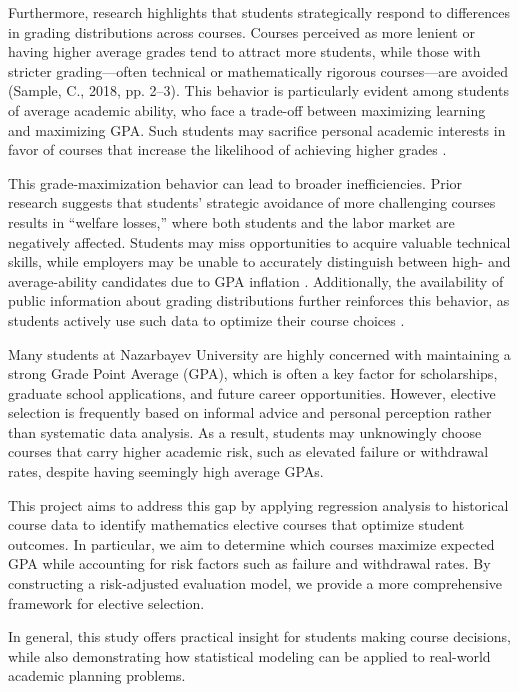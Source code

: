 \documentclass[a4paper,12pt,reqno]{amsart}
\numberwithin{equation}{section}
\theoremstyle{plain}
\theoremstyle{definition}
\begin{document}
Furthermore, research highlights that students strategically respond to differences in grading distributions across courses. Courses perceived as more lenient or having higher average grades tend to attract more students, while those with stricter grading—often technical or mathematically rigorous courses—are avoided (Sample, C., 2018, pp. 2–3). This behavior is particularly evident among students of average academic ability, who face a trade-off between maximizing learning and maximizing GPA. Such students may sacrifice personal academic interests in favor of courses that increase the likelihood of achieving higher grades \parencite[pp.8-9]{Sample2018}.

This grade-maximization behavior can lead to broader inefficiencies. Prior research suggests that students’ strategic avoidance of more challenging courses results in “welfare losses,” where both students and the labor market are negatively affected. Students may miss opportunities to acquire valuable technical skills, while employers may be unable to accurately distinguish between high- and average-ability candidates due to GPA inflation \parencite[pp.2,8]{Sample2018}. Additionally, the availability of public information about grading distributions further reinforces this behavior, as students actively use such data to optimize their course choices \parencite[p.~3]{Sample2018}.

Many students at Nazarbayev University are highly concerned with maintaining a strong Grade Point Average (GPA), which is often a key factor for scholarships, graduate school applications, and future career opportunities. However, elective selection is frequently based on informal advice and personal perception rather than systematic data analysis. As a result, students may unknowingly choose courses that carry higher academic risk, such as elevated failure or withdrawal rates, despite having seemingly high average GPAs.

This project aims to address this gap by applying regression analysis to historical course data to identify mathematics elective courses that optimize student outcomes. In particular, we aim to determine which courses maximize expected GPA while accounting for risk factors such as failure and withdrawal rates. By constructing a risk-adjusted evaluation model, we provide a more comprehensive framework for elective selection.

In general, this study offers practical insight for students making course decisions, while also demonstrating how statistical modeling can be applied to real-world academic planning problems.
\end{document}
